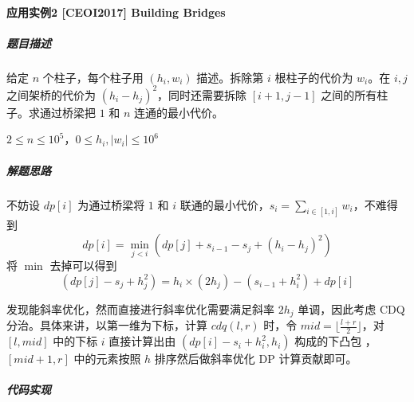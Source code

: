 \paragraph{应用实例2 {[}CEOI2017{]} Building Bridges}

\subparagraph{题目描述}

给定 \(n\) 个柱子，每个柱子用 \((h_i,w_i)\) 描述。拆除第 \(i\)
根柱子的代价为 \(w_i\)。在 \(i,j\) 之间架桥的代价为
\((h_i-h_j)^2\)，同时还需要拆除 \([i+1,j-1]\)
之间的所有柱子。求通过桥梁把 \(1\) 和 \(n\) 连通的最小代价。

\(2\leq n\leq 10^5\)，\(0\leq h_i,|w_i|\leq 10^6\)

\subparagraph{解题思路}

不妨设 \(dp[i]\) 为通过桥梁将 \(1\) 和 \(i\)
联通的最小代价，\(s_i=\sum_{i\in[1,i]}w_i\)，不难得到 \[
dp[i]=\min_{j\lt i}(dp[j]+s_{i-1}-s_j+(h_i-h_j)^2)
\] 将 \(\min\) 去掉可以得到 \[
(dp[j]-s_j+h_j^2)=h_i\times(2h_j)-(s_{i-1}+h_i^2)+dp[i]
\]

发现能斜率优化，然而直接进行斜率优化需要满足斜率 \(2h_j\) 单调，因此考虑
CDQ 分治。具体来讲，以第一维为下标，计算 \(cdq(l,r)\) 时，令
\(mid=\lfloor\frac{l+r}{2}\rfloor\)，对 \([l,mid]\) 中的下标 \(i\)
直接计算出由 \((dp[i]-s_i+h_i^2,h_i)\) 构成的下凸包 ，\([mid+1,r]\)
中的元素按照 \(h\) 排序然后做斜率优化 DP 计算贡献即可。

\subparagraph{代码实现}

